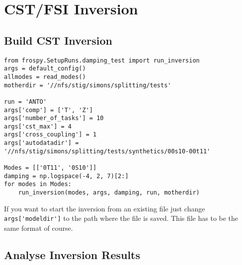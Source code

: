\documentclass{article}
\begin{document}
\section{CST/FSI Inversion}
\subsection{Build CST Inversion}
\begin{lstlisting}
from frospy.SetupRuns.damping_test import run_inversion
args = default_config()
allmodes = read_modes()
motherdir = '//nfs/stig/simons/splitting/tests'

run = 'ANTO'
args['comp'] = ['T', 'Z']
args['number_of_tasks'] = 10
args['cst_max'] = 4
args['cross_coupling'] = 1
args['autodatadir'] = '//nfs/stig/simons/splitting/tests/synthetics/00s10-00t11'

Modes = [['0T11', '0S10']]
damping = np.logspace(-4, 2, 7)[2:]
for modes in Modes:
    run_inversion(modes, args, damping, run, motherdir)
\end{lstlisting}

If you want to start the inversion from an existing file just change
\lstinline[columns=fixed]{args['modeldir']} to the path where the file is saved.
This file has to be the same format of course.

\subsection{Analyse Inversion Results}
\end{document}
